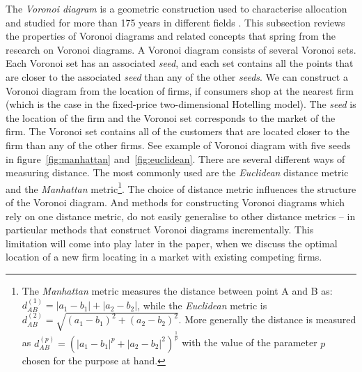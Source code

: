 \documentclass[preprint, 12pt]{elsarticle}
\begin{document}
The \emph{Voronoi diagram} is a geometric construction used to characterise allocation and studied for more than 175 years in different fields \citep[chapter~19]{Eiselt_Marianov_2011}. This subsection reviews the properties of Voronoi diagrams and related concepts that spring from the research on Voronoi diagrams. A Voronoi diagram consists of several Voronoi sets. Each Voronoi set has an associated \emph{seed}, and each set contains all the points that are closer to the associated \emph{seed} than any of the other \emph{seeds}. We can construct a Voronoi diagram from the location of firms, if consumers shop at the nearest firm (which is the case in the fixed-price two-dimensional Hotelling model). The \emph{seed} is the location of the firm and the Voronoi set corresponds to the market of the firm. The Voronoi set contains all of the customers that are located closer to the firm than any of the other firms. See example of Voronoi diagram with five seeds in figure~\ref{fig:manhattan} and~\ref{fig:euclidean}. There are several different ways of measuring distance. The most commonly used are the \emph{Euclidean} distance metric and the \emph{Manhattan} metric\footnote{The \emph{Manhattan} metric measures the distance between point A and B as: $d^{(1)}_{AB} = \left| {a_1 - b_1} \right| + \left| {a_2 - b_2} \right|$, while the \emph{Euclidean} metric is $d^{(2)}_{AB} = \sqrt{(a_1 - b_1)^2 + (a_2 - b_2)^2}$. More generally the distance is measured as $d^{(p)}_{AB} = \left({\left| {a_1 - b_1} \right|}^p + {\left| {a_2 - b_2} \right|}^2 \right)^{\frac{1}{p}}$ with the value of the parameter $p$ chosen for the purpose at hand.}. The choice of distance metric influences the structure of the Voronoi diagram. And methods for constructing Voronoi diagrams which rely on one distance metric, do not easily generalise to other distance metrics -- in particular methods that construct Voronoi diagrams incrementally. This limitation will come into play later in the paper, when we discuss the optimal location of a new firm locating in a market with existing competing firms.
\end{document}
